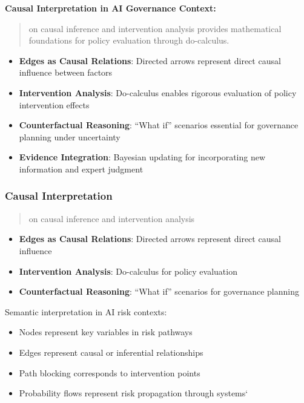 \documentclass[
  11pt,
  letterpaper,
]{book}
\providecommand{\tightlist}{%
  \setlength{\itemsep}{0pt}\setlength{\parskip}{0pt}}
\begin{document}
\textbf{Causal Interpretation in AI Governance Context:}

\begin{quote}
\textcite{pearl2009} on causal inference and intervention analysis
provides mathematical foundations for policy evaluation through
do-calculus.
\end{quote}

\begin{itemize}
\tightlist
\item
  \textbf{Edges as Causal Relations}: Directed arrows represent direct
  causal influence between factors
\item
  \textbf{Intervention Analysis}: Do-calculus enables rigorous
  evaluation of policy intervention effects
\item
  \textbf{Counterfactual Reasoning}: ``What if'' scenarios essential for
  governance planning under uncertainty
\item
  \textbf{Evidence Integration}: Bayesian updating for incorporating new
  information and expert judgment
\end{itemize}

\subsubsection{Causal Interpretation}\label{sec-causal-interpretation}

\begin{quote}
\textcite{pearl2009} on causal inference and intervention analysis
\end{quote}

\begin{itemize}
\tightlist
\item
  \textbf{Edges as Causal Relations}: Directed arrows represent direct
  causal influence
\item
  \textbf{Intervention Analysis}: Do-calculus for policy evaluation
\item
  \textbf{Counterfactual Reasoning}: ``What if'' scenarios for
  governance planning
\end{itemize}

Semantic interpretation in AI risk contexts:

\begin{itemize}
\tightlist
\item
  Nodes represent key variables in risk pathways
\item
  Edges represent causal or inferential relationships
\item
  Path blocking corresponds to intervention points
\item
  Probability flows represent risk propagation through systems`
\end{itemize}
\end{document}

